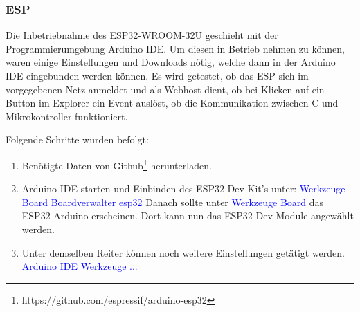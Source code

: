 \subsubsection{ESP}
\label{subsubsec:Inbetriebnahme_ESP}

Die Inbetriebnahme des ESP32-WROOM-32U geschieht mit der Programmierumgebung Arduino IDE. Um diesen in Betrieb nehmen zu können, waren einige Einstellungen und Downloads nötig, welche dann in der Arduino IDE eingebunden werden können. Es wird getestet, ob das ESP sich im vorgegebenen Netz anmeldet und als Webhost dient, ob bei Klicken auf ein Button im Explorer ein Event auslöst, ob die Kommunikation zwischen \textmu C und Mikrokontroller funktioniert.

Folgende Schritte wurden befolgt:
\begin{enumerate}
\item Benötigte Daten von Github\footnote{https://github.com/espressif/arduino-esp32} herunterladen.\newline
\item Arduino IDE starten und Einbinden des ESP32-Dev-Kit's unter:\newline
\textcolor{blue} {Werkzeuge \textrightarrow Board \textrightarrow Boardverwalter \textrightarrow esp32} \newline
Danach sollte unter \textcolor{blue} {Werkzeuge \textrightarrow Board} das ESP32 Arduino erscheinen. Dort kann nun das ESP32 Dev Module angewählt werden.\newline
\item Unter demselben Reiter können noch weitere Einstellungen getätigt werden.\newline
\textcolor{blue}{Arduino IDE \textrightarrow Werkzeuge \textrightarrow ...}\newline

\end{enumerate}
